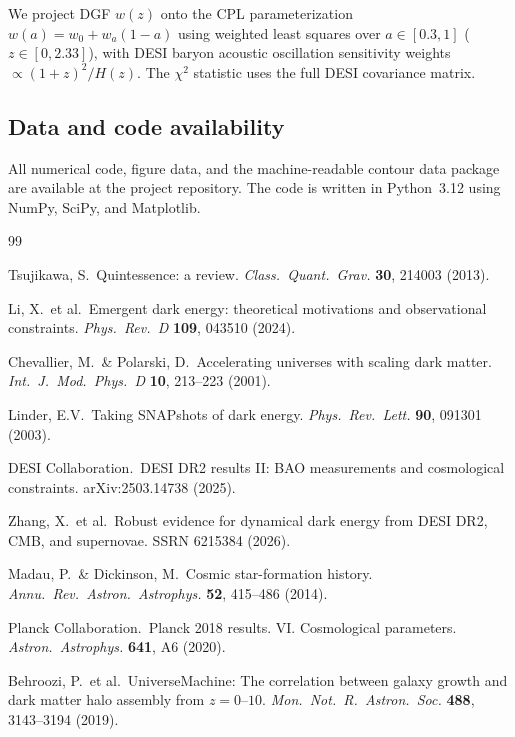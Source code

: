 \documentclass[12pt,a4paper]{article}
\begin{document}
We project DGF $w(z)$ onto the CPL parameterization $w(a)=w_0+w_a(1-a)$ using weighted least squares over $a\in[0.3,1]$ ($z\in[0,2.33]$), with DESI baryon acoustic oscillation sensitivity weights $\propto(1+z)^2/H(z)$. The $\chi^2$ statistic uses the full DESI covariance matrix.

\subsection*{Data and code availability}

All numerical code, figure data, and the machine-readable contour data package are available at the project repository. The code is written in Python~3.12 using NumPy, SciPy, and Matplotlib.

\begin{thebibliography}{99}

Tsujikawa, S.\ Quintessence: a review. {\it Class.\ Quant.\ Grav.} {\bf 30}, 214003 (2013).

Li, X.\ et al.\ Emergent dark energy: theoretical motivations and observational constraints. {\it Phys.\ Rev.\ D} {\bf 109}, 043510 (2024).

Chevallier, M.\ \& Polarski, D.\ Accelerating universes with scaling dark matter. {\it Int.\ J.\ Mod.\ Phys.\ D} {\bf 10}, 213--223 (2001).

Linder, E.V.\ Taking SNAPshots of dark energy. {\it Phys.\ Rev.\ Lett.} {\bf 90}, 091301 (2003).

DESI Collaboration.\ DESI DR2 results II: BAO measurements and cosmological constraints. arXiv:2503.14738 (2025).

Zhang, X.\ et al.\ Robust evidence for dynamical dark energy from DESI DR2, CMB, and supernovae. SSRN 6215384 (2026).

Madau, P.\ \& Dickinson, M.\ Cosmic star-formation history. {\it Annu.\ Rev.\ Astron.\ Astrophys.} {\bf 52}, 415--486 (2014).

Planck Collaboration.\ Planck 2018 results. VI. Cosmological parameters. {\it Astron.\ Astrophys.} {\bf 641}, A6 (2020).

Behroozi, P.\ et al.\ UniverseMachine: The correlation between galaxy growth and dark matter halo assembly from $z=0$--$10$. {\it Mon.\ Not.\ R.\ Astron.\ Soc.} {\bf 488}, 3143--3194 (2019).


\end{thebibliography}
\end{document}
